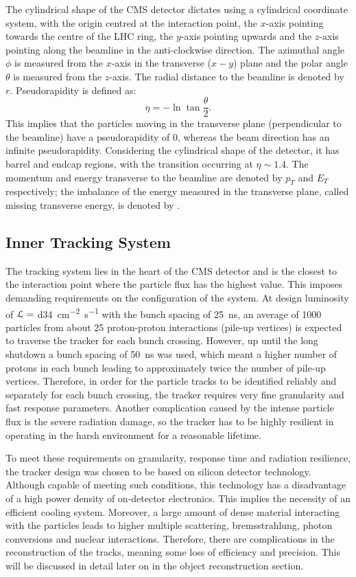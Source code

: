 The cylindrical shape of the CMS detector dictates using a cylindrical coordinate system, with the origin centred at the
interaction point, the $x$-axis pointing towards the centre of the LHC ring, the $y$-axis pointing upwards and the
$z$-axis pointing along the beamline in the anti-clockwise direction. The azimuthal angle $\phi$ is measured from the
$x$-axis in the transverse ($x-y$) plane and the polar angle $\theta$ is measured from the $z$-axis. The radial distance
to the beamline is denoted by $r$. Pseudorapidity is defined as:
\begin{equation}
  \eta = - \ln{\tan{\frac{\theta}{2}}}.
\end{equation}
This implies that the particles moving in the transverse plane (perpendicular to the beamline) have a pseudorapidity of
0, whereas the beam direction has an infinite pseudorapidity. Considering the cylindrical shape of the detector, it has
barrel and endcap regions, with the transition occurring at $\eta \sim 1.4$. The momentum and energy transverse to the
beamline are denoted by $p_T$ and $E_T$ respectively; the imbalance of the energy measured in the transverse plane,
called missing transverse energy, is denoted by \MET.

\subsection{Inner Tracking System}
\label{ss:tracker}
The tracking system lies in the heart of the CMS detector and is the closest to the interaction point where the particle
flux has the highest value. This imposes demanding requirements on the configuration of the system. At design luminosity
of $\mathcal{L} = $ \SI{d34}{\cm^{-2}~\s^{-1}} with the bunch spacing of \SI{25}{\ns}, an average of \num{1000} particles from
about \num{25} proton-proton interactions (pile-up vertices) is expected to traverse the tracker for each bunch
crossing. However, up until the long shutdown a bunch spacing of \SI{50}{\ns} was used, which meant a higher number of
protons in each bunch leading to approximately twice the number of pile-up vertices. Therefore, in order for the
particle tracks to be identified reliably and separately for each bunch crossing, the tracker requires very fine
granularity and fast response parameters. Another complication caused by the intense particle flux is the severe
radiation damage, so the tracker has to be highly resilient in operating in the harsh environment for a reasonable
lifetime.

To meet these requirements on granularity, response time and radiation resilience, the tracker design was chosen to be
based on silicon detector technology. Although capable of meeting such conditions, this technology has a disadvantage of
a high power density of on-detector electronics. This implies the necessity of an efficient cooling system. Moreover, a
large amount of dense material interacting with the particles leads to higher multiple scattering, bremsstrahlung,
photon conversions and nuclear interactions. Therefore, there are complications in the reconstruction of the tracks,
meaning some loss of efficiency and precision. This will be discussed in detail later on in the object reconstruction
section.

